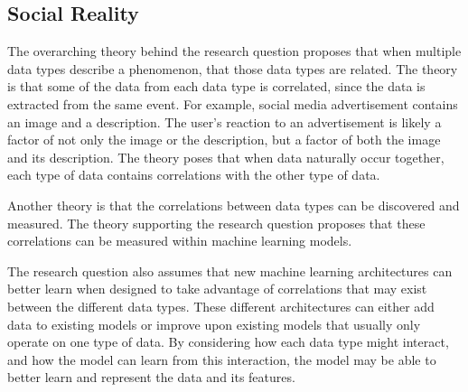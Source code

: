 \subsection{Social Reality}

The overarching theory behind the research question proposes that when multiple data types describe a phenomenon, that those data types are related. The theory is that some of the data from each data type is correlated, since the data is extracted from the same event.  %
For example, social media advertisement contains an image and a description.  The user's reaction to an advertisement is likely a factor of not only the image or the description, but a factor of both the image and its description.  The theory poses that when data naturally occur together, each type of data contains correlations with the other type of data.

Another theory is that the correlations between data types can be discovered and measured. The theory supporting the research question proposes that these correlations can be measured within machine learning models.

The research question also assumes that new machine learning architectures can better learn when designed to take advantage of correlations that may exist between the different data types.  These different architectures can either add data to existing models or improve upon existing models that usually only operate on one type of data.  By considering how each data type might interact, and how the model can learn from this interaction, the model may be able to better learn and represent the data and its features.  
